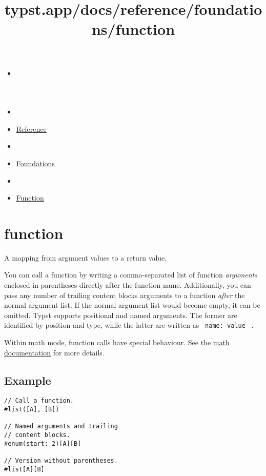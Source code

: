 \title{typst.app/docs/reference/foundations/function}

\begin{itemize}
\tightlist
\item
  \href{/docs}{}
\item
  
\item
  \href{/docs/reference/}{Reference}
\item
  
\item
  \href{/docs/reference/foundations/}{Foundations}
\item
  
\item
  \href{/docs/reference/foundations/function/}{Function}
\end{itemize}

\section{\texorpdfstring{{ function }}{ function }}\label{summary}

A mapping from argument values to a return value.

You can call a function by writing a comma-separated list of function
\emph{arguments} enclosed in parentheses directly after the function
name. Additionally, you can pass any number of trailing content blocks
arguments to a function \emph{after} the normal argument list. If the
normal argument list would become empty, it can be omitted. Typst
supports positional and named arguments. The former are identified by
position and type, while the latter are written as
\texttt{\ name:\ value\ } .

Within math mode, function calls have special behaviour. See the
\href{/docs/reference/math/}{math documentation} for more details.

\subsection{Example}\label{example}

\begin{verbatim}
// Call a function.
#list([A], [B])

// Named arguments and trailing
// content blocks.
#enum(start: 2)[A][B]

// Version without parentheses.
#list[A][B]
\end{verbatim}

